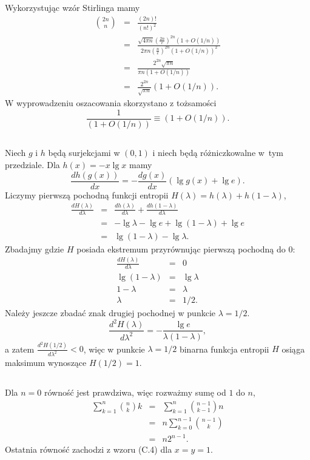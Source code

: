 \subsection{} %
Wykorzystując wzór Stirlinga mamy
\begin{eqnarray*}
	\binom{2n}{n} &=& \frac{(2n)!}{(n!)^2} \\
	&=& \frac{\sqrt{4\pi n}\left(\frac{2n}{e}\right)^{2n}\left(1+O(1/n)\right)}{2\pi n\left(\frac{n}{e}\right)^{2n}\left(1+O(1/n)\right)^2} \\
	&=& \frac{2^{2n}\sqrt{\pi n}}{\pi n\left(1+O(1/n)\right)} \\
	&=& \frac{2^{2n}}{\sqrt{\pi n}}\left(1+O(1/n)\right).
\end{eqnarray*}
W wyprowadzeniu oszacowania skorzystano z tożsamości
\[
	\frac{1}{\left(1+O(1/n)\right)} \equiv \left(1+O(1/n)\right).
\]

\subsection{} %
Niech $g$ i $h$ będą surjekcjami w $(0,1)$ i niech będą różniczkowalne w~tym przedziale. Dla $h(x) = -x\lg x$ mamy
\[
	\frac{dh(g(x))}{dx} = -\frac{dg(x)}{dx}\left(\lg g(x)+\lg e\right).
\]
Liczymy pierwszą pochodną funkcji entropii $H(\lambda)=h(\lambda)+h(1-\lambda)$,
\begin{eqnarray*}
	\frac{dH(\lambda)}{d\lambda} &=& \frac{dh(\lambda)}{d\lambda}+\frac{dh(1-\lambda)}{d\lambda} \\
	&=& -\lg\lambda-\lg e+\lg(1-\lambda)+\lg e \\
	&=& \lg\left(1-\lambda\right)-\lg\lambda.
\end{eqnarray*}
Zbadajmy gdzie $H$ posiada ekstremum przyrównując pierwszą pochodną do $0$:
\begin{eqnarray*}
	\frac{dH(\lambda)}{d\lambda} &=& 0 \\
	\lg\left(1-\lambda\right) &=& \lg\lambda \\
	1-\lambda &=& \lambda \\
	\lambda &=& 1/2.
\end{eqnarray*}
Należy jeszcze zbadać znak drugiej pochodnej w punkcie $\lambda=1/2$.
\[
	\frac{d^2H(\lambda)}{d\lambda^2} = -\frac{\lg e}{\lambda(1-\lambda)},
\]
a zatem $\frac{d^2H(1/2)}{d\lambda^2}<0$, więc w punkcie $\lambda=1/2$ binarna funkcja entropii $H$ osiąga maksimum wynoszące $H(1/2)=1$.

\subsection{} %
Dla $n=0$ równość jest prawdziwa, więc rozważmy sumę od $1$ do $n$,
\begin{eqnarray*}
	\sum_{k=1}^n\binom{n}{k}k &=& \sum_{k=1}^n\binom{n-1}{k-1}n \\
	&=& n\sum_{k=0}^{n-1}\binom{n-1}{k} \\
	&=& n2^{n-1}.
\end{eqnarray*}
Ostatnia równość zachodzi z wzoru (C.4) dla $x=y=1$.


